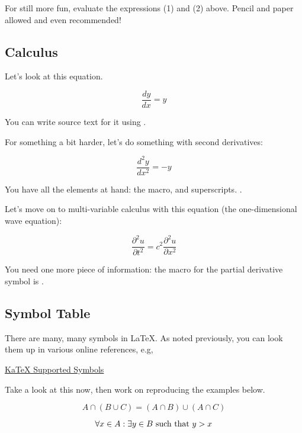 For still more fun, evaluate the expressions (1) and (2) above. Pencil and paper allowed and even recommended!

\subsection{Calculus}

Let's look at this equation.

 $$ \frac{dy}{dx} = y $$

You can write source text for it using .  

For something a bit harder, let's do something with second derivatives:

$$
  \frac{d^2y}{dx^2} = - y
$$

You have all the elements at hand: the  macro, and superscripts.  .

Let's move on to multi-variable calculus with this equation (the one-dimensional wave equation):

$$
\frac{\partial^2 u}{\partial t^2} =  c^2 \frac{\partial^2 u}{\partial x^2}
$$

You need one more piece of information: the macro for the partial derivative symbol is . 

\subsection{Symbol Table}

There are many, many symbols in LaTeX.  As noted previously, you can look them up in various online references, e.g,


\begin{center}
\href{https://katex.org/docs/supported.html}{KaTeX Supported Symbols}
\end{center}

Take a look at this now, then work on reproducing the examples below.


$$
A \cap (B \cup C) = (A \cap B) \cup (A \cap C)
$$


$$
\forall x \in A : \exists y \in B\space \text{ such that } y > x
$$


